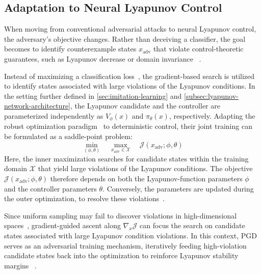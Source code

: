 \subsection{Adaptation to Neural Lyapunov Control}
\label{subsec:pgd-lyapunov-control}

When moving from conventional adversarial attacks to neural Lyapunov control, the adversary's objective changes. 
Rather than deceiving a classifier, the goal becomes to identify counterexample states $x_{\mathrm{adv}}$ 
that violate control-theoretic guarantees, such as Lyapunov decrease  
or domain invariance ~\cite{yangLyapunovstableNeuralControl2024}.

Instead of maximizing a classification loss~\cite{goodfellowExplainingHarnessingAdversarial2015,madryDeepLearningModels2019}, 
the gradient-based search is utilized to identify states associated with large violations of the Lyapunov conditions.
In the setting further defined in \cref{sec:imitation-learning} and \cref{subsec:lyapunov-network-architecture}, 
the Lyapunov candidate and the controller are parameterized independently as $V_\phi(x)$ and $\pi_\theta(x)$, 
respectively.
Adapting the robust optimization paradigm~\cite{madryDeepLearningModels2019} to deterministic control, 
their joint training can be formulated as a saddle-point problem:
\begin{equation}
    \label{eq:lyapunov-min-max}
    \min_{(\phi,\theta)} 
    \quad 
    \max_{x_{\mathrm{adv}} \in \mathcal{X}} 
    \quad 
    \mathcal{J}(x_{\mathrm{adv}}; \phi,\theta)
\end{equation}
Here, the inner maximization searches for candidate states within the training domain $\mathcal{X}$ 
that yield large violations of the Lyapunov conditions. The objective $\mathcal{J}(x_{\mathrm{adv}};\phi,\theta)$ 
therefore depends on both the Lyapunov-function parameters $\phi$ and the controller parameters $\theta$.
Conversely, the parameters are updated during the outer optimization, to resolve these 
violations~\cite{madryDeepLearningModels2019}.

Since uniform sampling may fail to discover violations in high-dimensional spaces~, 
gradient-guided ascent along $\nabla_{x} \mathcal{J}$ can focus the search on candidate states associated with large 
Lyapunov condition violations. In this context, PGD serves as an adversarial training mechanism, 
iteratively feeding high-violation candidate states back into the optimization to reinforce Lyapunov stability margins~
\cite{madryDeepLearningModels2019,yangLyapunovstableNeuralControl2024}.